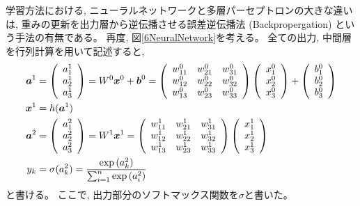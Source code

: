 学習方法における, ニューラルネットワークと多層パーセプトロンの大きな違いは, 重みの更新を出力層から逆伝播させる誤差逆伝播法 (Backpropergation\cite{Backpropagation}) という手法の有無である。
再度, 図\ref{6NeuralNetwork}を考える。
全ての出力, 中間層を行列計算を用いて記述すると, 
\begin{equation}
 \begin{split}
  {\mbox{\boldmath{$a$}}}^1&=
  \left(
    \begin{array}{ccc}
      a^1_1 \\
      a^1_2 \\
      a^1_3 
    \end{array}
  \right)
  =
  W^0{\mbox{\boldmath{$x$}}}^0 + {\mbox{\boldmath{$b$}}}^0
  =
  \left(
    \begin{array}{ccc}
      w^0_{11} & w^0_{21} & w^0_{31} \\
      w^0_{12} & w^0_{22} & w^0_{32} \\
      w^0_{13} & w^0_{23} & w^0_{33}
    \end{array}
  \right)
  \left(
    \begin{array}{ccc}
      x^0_1 \\
      x^0_2 \\
      x^0_3
    \end{array}
  \right)
  +
  \left(
    \begin{array}{ccc}
      b^0_1 \\
      b^0_2 \\
      b^0_3
    \end{array}
  \right)\\
  {\mbox{\boldmath{$x$}}}^1&=h({\mbox{\boldmath{$a$}}}^1)\\
  {\mbox{\boldmath{$a$}}}^2&=
  \left(
    \begin{array}{ccc}
      a^2_1 \\
      a^2_2 \\
      a^2_3 
    \end{array}
  \right)
  =
  W^1{\mbox{\boldmath{$x$}}}^1
  =
  \left(
    \begin{array}{ccc}
      w^1_{11} & w^1_{21} & w^1_{31} \\
      w^1_{12} & w^1_{22} & w^1_{32} \\
      w^1_{13} & w^1_{23} & w^1_{33}
    \end{array}
  \right)
  \left(
    \begin{array}{ccc}
      x^1_1 \\
      x^1_2 \\
      x^1_3
    \end{array}
  \right)\\
 y_k &= \sigma(a^2_k) = \frac{\exp{(a^2_k)}}{\sum^n_{i=1}\exp{(a^2_i)}}
 \end{split}
\end{equation}
と書ける。
ここで, 出力部分のソフトマックス関数を$\sigma$と書いた。

